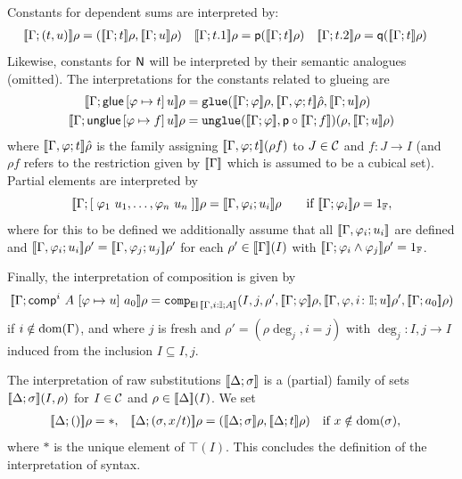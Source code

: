 Constants for dependent sums are interpreted by:
\begin{align*}
  \den{\Gamma; (t,u)} \rho &= (\den {\Gamma;t} \rho, \den {\Gamma;u}
  \rho)
  &
  \den{\Gamma; t.1} \rho &= \pp (\den{\Gamma; t} \rho)
  &
  \den{\Gamma; t.2} \rho &= \qq (\den{\Gamma; t} \rho)
\end{align*}
Likewise, constants for $\hbox{\sf N}$ will be interpreted by their semantic
analogues (omitted).
The interpretations for the constants related to glueing are
\begin{align*}
  \den{\Gamma; \glue \, [\varphi \mapsto t] \, u} \rho &= %
  \sglue (\den{\Gamma;\varphi} \rho, \den{\Gamma, \varphi; t}
  \hat\rho, \den{\Gamma;u} \rho)
  \\
  \den{\Gamma; \ugl \, [\varphi \mapsto \myeq] \, u} \rho &= %
  \sugl (\den{\Gamma;\varphi}, \pp \circ \den{\Gamma;\myeq}) (\rho,
  \den{\Gamma; u} \rho)
\end{align*}
where $[\![\Gamma, \varphi; t]\!] \hat\rho$ is the family assigning
$[\![\Gamma, \varphi; t]\!] (\rho f)$ to $J \in \mathcal{C}$ and $f \colon J \to
I$ (and $\rho f$ refers to the restriction given by $[\![\Gamma]\!]$
which is assumed to be a cubical set). Partial elements are
interpreted by
\[
[\![\Gamma; [ \; \varphi_1 ~ u_1, \dots, \varphi_n ~
  u_n \; ]]\!] \rho = [\![\Gamma,\varphi_i;u_i]\!] \rho \qquad \text{if }
[\![\Gamma;\varphi_i]\!] \rho = 1_{\mathbb{F}},
\]
where for this to be defined we additionally assume that all
$[\![\Gamma,\varphi_i;u_i]\!]$ are defined and
$[\![\Gamma,\varphi_i;u_i]\!] \rho' = [\![\Gamma,\varphi_j;u_j]\!] \rho'$
for each $\rho' \in [\![\Gamma]\!] (I)$ with $[\![\Gamma;\varphi_i
  \land \varphi_j]\!] \rho' = 1_{\mathbb{F}}$.

Finally, the interpretation of composition is given by
\[
\den{\Gamma;\comp^i~A~[ \varphi \mapsto u ]~a_0} \rho = %
\scomp_{\El {\den{\Gamma, i : \II;A}}} (I,j,\rho',\den{\Gamma;\varphi}
\rho, \den{\Gamma,\varphi,i \colon
  \II; u} \rho' , \den{\Gamma;a_0} \rho)
\]
if $i \notin \operatorname{dom}(\Gamma)$, and where $j$ is fresh and $\rho' = (\rho
\deg_j, i=j)$ with $\deg_j \colon I,j \to I$ induced from the
inclusion $I \subseteq I,j$.


The interpretation of raw substitutions $[\![\Delta;\sigma]\!]$
is a (partial) family of sets $[\![\Delta;\sigma]\!] (I,\rho)$
for $I\in \mathcal{C}$ and $\rho \in [\![\Delta]\!] (I)$.  We set
\begin{align*}
  \den{\Delta;()} \rho &= *, & %
  \den{\Delta; (\sigma, x / t)} \rho &= %
  (\den{\Delta;\sigma} \rho, \den{\Delta;t} \rho) \quad \text{if } x
  \notin \dom(\sigma),
\end{align*}
where $*$ is the unique element of $\top (I)$.  This concludes the
definition of the interpretation of syntax.
\medskip

